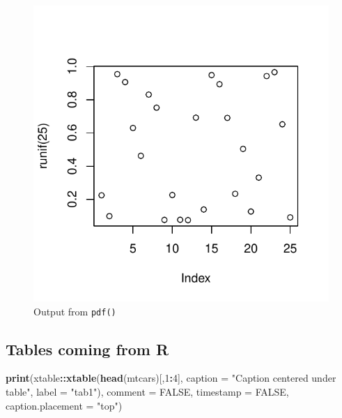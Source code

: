 \documentclass[useAMS,usenatbib,referee]{biom}
\newenvironment{Shaded}{\begin{snugshade}}{\end{snugshade}}
\newcommand{\DataTypeTok}[1]{\textcolor[rgb]{0.13,0.29,0.53}{#1}}
\newcommand{\DecValTok}[1]{\textcolor[rgb]{0.00,0.00,0.81}{#1}}
\newcommand{\KeywordTok}[1]{\textcolor[rgb]{0.13,0.29,0.53}{\textbf{#1}}}
\newcommand{\NormalTok}[1]{#1}
\newcommand{\OperatorTok}[1]{\textcolor[rgb]{0.81,0.36,0.00}{\textbf{#1}}}
\newcommand{\OtherTok}[1]{\textcolor[rgb]{0.56,0.35,0.01}{#1}}
\newcommand{\StringTok}[1]{\textcolor[rgb]{0.31,0.60,0.02}{#1}}
\begin{document}
\begin{figure}
\centering
\includegraphics{Biometrics-paper-draft_files/figure-latex/fig2-1.pdf}
\caption{Output from \texttt{pdf()}}
\end{figure}

\clearpage

\hypertarget{tables-coming-from-r}{%
\subsection{Tables coming from R}\label{tables-coming-from-r}}

\begin{Shaded}
\begin{Highlighting}[]
\KeywordTok{print}\NormalTok{(xtable}\OperatorTok{::}\KeywordTok{xtable}\NormalTok{(}\KeywordTok{head}\NormalTok{(mtcars)[,}\DecValTok{1}\OperatorTok{:}\DecValTok{4}\NormalTok{], }
\DataTypeTok{caption =} \StringTok{"Caption centered under table"}\NormalTok{, }\DataTypeTok{label =} \StringTok{"tab1"}\NormalTok{), }
\DataTypeTok{comment =} \OtherTok{FALSE}\NormalTok{, }\DataTypeTok{timestamp =} \OtherTok{FALSE}\NormalTok{, }\DataTypeTok{caption.placement =} \StringTok{"top"}\NormalTok{)}
\end{Highlighting}
\end{Shaded}
\end{document}
